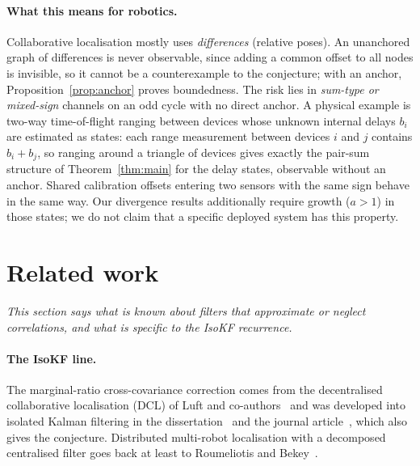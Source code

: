 \documentclass[11pt,a4paper]{article}
\numberwithin{equation}{section}
\theoremstyle{remark}\newtheorem{remark}[theorem]{Remark}
\begin{document}
\paragraph{What this means for robotics.} Collaborative localisation mostly uses
\emph{differences} (relative poses). An unanchored graph of differences is never observable,
since adding a common offset to all nodes is invisible, so it cannot be a counterexample to the
conjecture; with an anchor, Proposition~\ref{prop:anchor} proves boundedness. The risk lies in
\emph{sum-type or mixed-sign} channels on an odd cycle with no direct anchor. A physical
example is two-way time-of-flight ranging between devices whose unknown internal delays
$b_i$ are estimated as states: each range measurement between devices $i$ and $j$ contains
$b_i+b_j$, so ranging around a triangle of devices gives exactly the pair-sum structure of
Theorem~\ref{thm:main} for the delay states, observable without an anchor. Shared calibration
offsets entering two sensors with the same sign behave in the same way. Our divergence results
additionally require growth ($a>1$) in those states; we do not claim that a specific deployed
system has this property.

\section{Related work}\label{sec:related}

\emph{This section says what is known about filters that approximate or neglect correlations,
and what is specific to the IsoKF recurrence.}

\paragraph{The IsoKF line.} The marginal-ratio cross-covariance correction comes from the
decentralised collaborative localisation (DCL) of Luft and co-authors~\citep{Luft2016,Luft2018} and
was developed into isolated Kalman filtering in the dissertation~\citep{Jung2023thesis} and the
journal article~\citep{JungLuftWeiss2025}, which also gives the conjecture. Distributed
multi-robot localisation with a decomposed centralised filter goes back at least to
Roumeliotis and Bekey~\citep{RoumeliotisBekey2002}.
\end{document}
